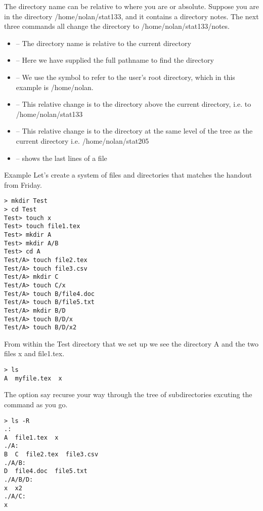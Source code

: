 
The directory name can be relative to where you are or absolute. 
Suppose you are in the directory /home/nolan/stat133, and it contains a directory notes. 
The next three commands all change the directory to /home/nolan/stat133/notes.

\begin{itemize}
\item {} -- The directory name is relative to the current directory
\item {} -- Here we have supplied
the full pathname to find the directory

\item {} -- We use the symbol \shellCmd{\~} to 
 refer to the user's root directory, which in this example is /home/nolan.

\item {} -- This relative change is to the directory above the current directory, i.e. to /home/nolan/stat133

\item {} -- This relative change is to the directory 
at the same level of the tree as the current directory i.e. /home/nolan/stat205 


\item {} -- shows the last lines of a file
\end{itemize}

{Example}
Let's create a system of files and directories that matches the
handout from Friday.

\begin{verbatim}
> mkdir Test
> cd Test
Test> touch x
Test> touch file1.tex
Test> mkdir A
Test> mkdir A/B
Test> cd A
Test/A> touch file2.tex
Test/A> touch file3.csv
Test/A> mkdir C
Test/A> touch C/x
Test/A> touch B/file4.doc
Test/A> touch B/file5.txt
Test/A> mkdir B/D
Test/A> touch B/D/x
Test/A> touch B/D/x2
\end{verbatim}


From within the Test directory that we set up 
we see the directory A and the two files x and file1.tex.
\begin{verbatim}
> ls
A  myfile.tex  x
\end{verbatim}

The  option say recurse your way through the tree of subdirectories excuting the  command as you go.

{\small{
\begin{verbatim}
> ls -R
.:
A  file1.tex  x
./A:
B  C  file2.tex  file3.csv
./A/B:
D  file4.doc  file5.txt
./A/B/D:
x  x2
./A/C:
x
\end{verbatim}
}}


